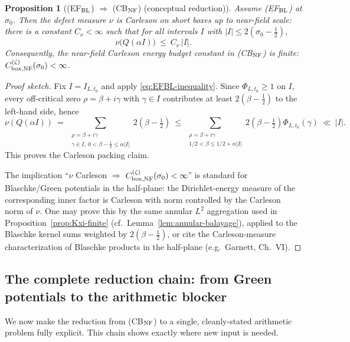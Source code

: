 \documentclass[11pt]{article}
\newtheorem{proposition}[theorem]{Proposition}
\theoremstyle{definition}
\theoremstyle{remark}
\theoremstyle{definition}
\begin{document}
\begin{proposition}[\textup{(EF$_{\rm BL}$)} $\Rightarrow$ \textup{(CB$_{\rm NF}$)} (conceptual reduction)]\label{prop:EFBL-implies-CBNF}
Assume \textup{(EF$_{\rm BL}$)} at $\sigma_0$.
Then the defect measure $\nu$ is Carleson on short boxes up to near-field scale:
there is a constant $C_\nu<\infty$ such that for all intervals $I$ with $|I|\le 2(\sigma_0-\tfrac12)$,
\[
  \nu\big(Q(\alpha I)\big)\ \le\ C_\nu\,|I|.
\]
Consequently, the near-field Carleson energy budget constant in \textup{(CB$_{\rm NF}$)} is finite:
$C_{{\rm box},{\rm NF}}^{(\zeta)}(\sigma_0)<\infty$.
\end{proposition}
\begin{proof}[Proof sketch]
Fix $I=I_{L,t_0}$ and apply \eqref{eq:EFBL-inequality}. Since $\Phi_{L,t_0}\ge 1$ on $I$, every off-critical zero $\rho=\beta+i\gamma$ with $\gamma\in I$ contributes at least $2(\beta-\tfrac12)$ to the left-hand side, hence
\[
  \nu(Q(\alpha I))\ =\ \sum_{\substack{\rho=\beta+i\gamma\\ \gamma\in I,\ 0<\beta-\tfrac12\le \alpha|I|}}
  2(\beta-\tfrac12)
  \ \le\ \sum_{\substack{\rho=\beta+i\gamma\\ 1/2<\beta\le 1/2+\alpha|I|}}2(\beta-\tfrac12)\Phi_{L,t_0}(\gamma)
  \ \ll\ |I|.
\]
This proves the Carleson packing claim.

The implication ``$\nu$ Carleson $\Rightarrow$ $C_{{\rm box},{\rm NF}}^{(\zeta)}(\sigma_0)<\infty$'' is standard for Blaschke/Green potentials in the half-plane: the Dirichlet-energy measure of the corresponding inner factor is Carleson with norm controlled by the Carleson norm of $\nu$.
One may prove this by the same annular $L^2$ aggregation used in Proposition~\ref{prop:Kxi-finite} (cf.\ Lemma~\ref{lem:annular-balayage}), applied to the Blaschke kernel sums weighted by $2(\beta-\tfrac12)$, or cite the Carleson-measure characterization of Blaschke products in the half-plane (e.g.\ Garnett, Ch.~VI).
\end{proof}

\subsection*{The complete reduction chain: from Green potentials to the arithmetic blocker}

We now make the reduction from \textup{(CB$_{\rm NF}$)} to a single, cleanly-stated arithmetic problem fully explicit. This chain shows exactly where new input is needed.
\end{document}
